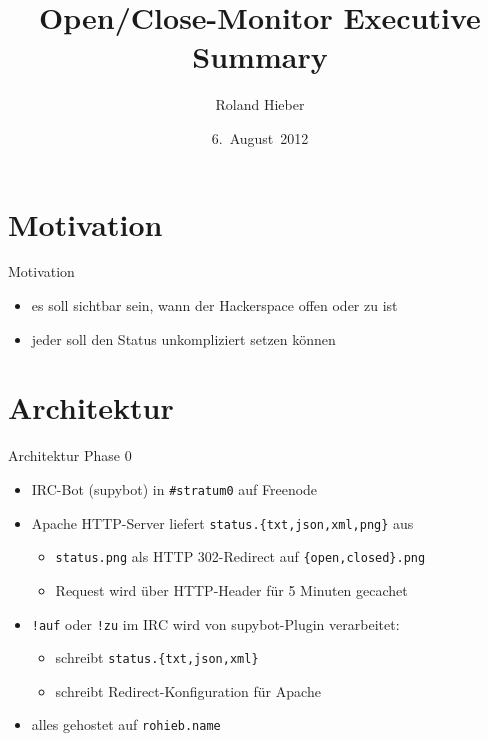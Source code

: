 \documentclass[handout]{beamer}
\author{Roland Hieber}
\title{Open/Close-Monitor Executive Summary}
\institute{Stratum~0~e.~V.}
\date{6.~August~2012}
\begin{document}
\begin{frame}
  \titlepage
  \thispagestyle{empty}
\end{frame}

\section{Motivation}
\begin{frame}{Motivation}
  \begin{itemize}
    \item es soll sichtbar sein, wann der Hackerspace offen oder zu ist
    \item jeder soll den Status unkompliziert setzen können
  \end{itemize}
\end{frame}

\section{Architektur}
\begin{frame}{Architektur Phase 0}
	\begin{itemize}
		\item IRC-Bot (supybot) in \texttt{\#stratum0} auf Freenode
		\item Apache HTTP-Server liefert \texttt{status.\{txt,json,xml,png\}} aus
		\begin{itemize}
			\item \texttt{status.png} als HTTP 302-Redirect auf
				\texttt{\{open,closed\}.png}
			\item Request wird über HTTP-Header für 5 Minuten gecachet
		\end{itemize}
		\item \texttt{!auf} oder \texttt{!zu} im IRC wird von supybot-Plugin
			verarbeitet:
		\begin{itemize}
			\item schreibt \texttt{status.\{txt,json,xml\}}
			\item schreibt Redirect-Konfiguration für Apache
		\end{itemize}
		
		\item alles gehostet auf \texttt{rohieb.name}
	\end{itemize}
\end{frame}
\end{document}
